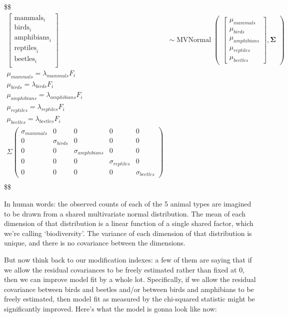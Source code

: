 \documentclass[
  letterpaper,
  DIV=11,
  numbers=noendperiod]{scrreprt}
\begin{document}
\$\$ \begin{align*}
\begin{bmatrix} \text{mammals}_i \\ \text{birds}_i \\ \text{amphibians}_i \\ \text{reptiles}_i \\ \text{beetles}_i \\ \end{bmatrix} & \sim
\operatorname{MVNormal} \begin{pmatrix} \begin{bmatrix} \mu_{mammals} \\ \mu_{birds} \\ \mu_{amphibians} \\ \mu_{reptiles} \\ \mu_{beetles} \end{bmatrix}, \mathbf \Sigma\end{pmatrix}\\

\mu_{mammals} = \lambda_{mammals} F_i \\
\mu_{birds} = \lambda_{birds} F_i \\
\mu_{amphibians} = \lambda_{amphibians} F_i \\
\mu_{reptiles} = \lambda_{reptiles} F_i \\
\mu_{beetles} = \lambda_{beetles} F_i \\

\Sigma \begin{pmatrix} 
\sigma_{mammals}&0 &0 &0 &0 \\ 
0 & \sigma_{birds} &0 &0 &0 \\ 
0 & 0 & \sigma_{amphibians} &0 &0 \\ 
0 & 0 & 0 & \sigma_{reptiles} &0 \\ 
0 & 0 & 0 & 0 & \sigma_{beetles} 
\end{pmatrix} \\
\end{align*} \$\$

In human words: the observed counts of each of the 5 animal types are
imagined to be drawn from a shared multivariate normal distribution. The
mean of each dimension of that distribution is a linear function of a
single shared factor, which we're calling `biodiversity'. The variance
of each dimension of that distribution is unique, and there is no
covariance between the dimensions.

But now think back to our modification indexes: a few of them are saying
that if we allow the residual covariances to be freely estimated rather
than fixed at 0, then we can improve model fit by a whole lot.
Specifically, if we allow the residual covariance between birds and
beetles and/or between birds and amphibians to be freely estimated, then
model fit as measured by the chi-squared statistic might be
significantly improved. Here's what the model is gonna look like now:
\end{document}
